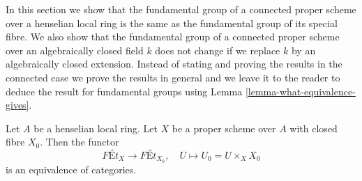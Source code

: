 \noindent
In this section we show that the fundamental group of a connected proper
scheme over a henselian local ring is the same as the fundamental
group of its special fibre. We also show that the fundamental
group of a connected proper scheme over an algebraically closed field $k$
does not change if we replace $k$ by an algebraically closed extension.
Instead of stating and proving the results in the connected case
we prove the results in general and we leave it to the reader to deduce
the result for fundamental groups using
Lemma \ref{lemma-what-equivalence-gives}.

\begin{lemma}
\label{lemma-finite-etale-on-proper-over-henselian}
Let $A$ be a henselian local ring. Let $X$ be a proper scheme over $A$
with closed fibre $X_0$. Then the functor
$$
\textit{F\'Et}_X \to \textit{F\'Et}_{X_0},\quad
U \longmapsto U_0 = U \times_X X_0
$$
is an equivalence of categories.
\end{lemma}


